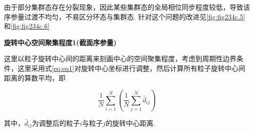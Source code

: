 \documentclass{article}
\begin{document}
\vspace{-0.5cm}
由于部分集群态存在分裂现象，因此某些集群态的全局相位同步程度较低，导致该序参量过渡不均匀，不易区分环态与集群态. 针对这个问题的改进见\ref{fig:fig234c.5}和\ref{fig:fig234c.6}


\newpage
\noindent\textbf{旋转中心空间聚集程度1(截面序参量)}

这里以粒子旋转中心间的距离来刻画中心的空间聚集程度，考虑到周期性边界条件，这里采用式\ref{eq:eq1}对旋转中心坐标进行调整，然后计算所有粒子旋转中心间距离的算数平均，即

$$
\frac{1}{N}\sum_{i=1}^N{\left( \frac{1}{N}\sum_{j=1}^N{\bar{d}_{ij}} \right)}
$$

其中，$\bar{d}_{ij}$为调整后的粒子$i$与粒子$j$的旋转中心距离.
\end{document}
